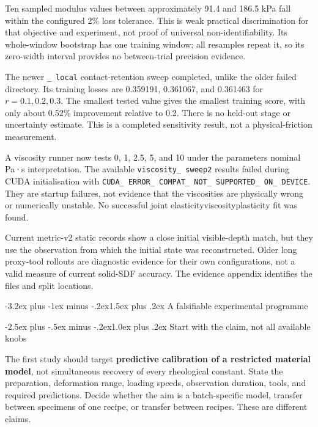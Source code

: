 \documentclass[
  11pt,
]{article}
\makeatletter
\renewcommand\section{\needspace{7\baselineskip}\@startsection{section}{1}{\z@}%
  {-3.2ex plus -1ex minus -.2ex}{1.5ex plus .2ex}%
  {\normalfont\sffamily\Large\bfseries\color{accent}}}
\renewcommand\subsection{\needspace{5\baselineskip}\@startsection{subsection}{2}{\z@}%
  {-2.5ex plus -.5ex minus -.2ex}{1.0ex plus .2ex}%
  {\normalfont\sffamily\large\bfseries\color{accent}}}
\makeatother
\begin{document}
Ten sampled modulus values between approximately 91.4 and 186.5 kPa fall
within the configured 2\% loss tolerance. This is weak practical
discrimination for that objective and experiment, not proof of universal
non-identifiability. Its whole-window bootstrap has one training window;
all resamples repeat it, so its zero-width interval provides no
between-trial precision evidence.

The newer \texttt{\_ local} contact-retention sweep
completed, unlike the older failed directory. Its training losses are
0.359191, 0.361067, and 0.361463 for \(r=0.1,0.2,0.3\). The smallest
tested value gives the smallest training score, with only about 0.52\%
improvement relative to 0.2. There is no held-out stage or uncertainty
estimate. This is a completed sensitivity result, not a
physical-friction measurement.

A viscosity runner now tests 0, 1, 2.5, 5, and 10 under the
parameter\textquotesingle s nominal Pa·s interpretation. The available
\texttt{viscosity\_ sweep2} results failed during CUDA
initialisation with
\texttt{CUDA\_ ERROR\_ COMPAT\_ NOT\_ SUPPORTED\_ ON\_ DEVICE}.
They are startup failures, not evidence that the viscosities are
physically wrong or numerically unstable. No successful joint
elasticity\textendash{}\allowbreak{}viscosity\textendash{}\allowbreak{}plasticity
fit was found.

Current metric-v2 static records show a close initial visible-depth
match, but they use the observation from which the initial state was
reconstructed. Older long proxy-tool rollouts are diagnostic evidence
for their own configurations, not a valid measure of current solid-SDF
accuracy. The evidence appendix identifies the files and split
locations.

\section{A falsifiable experimental
programme}\label{a-falsifiable-experimental-programme}

\subsection{Start with the claim, not all available
knobs}\label{start-with-the-claim-not-all-available-knobs}

The first study should target \textbf{predictive calibration of a
restricted material model}, not simultaneous recovery of every
rheological constant. State the preparation, deformation range, loading
speeds, observation duration, tools, and required predictions. Decide
whether the aim is a batch-specific model, transfer between specimens of
one recipe, or transfer between recipes. These are different claims.
\end{document}
